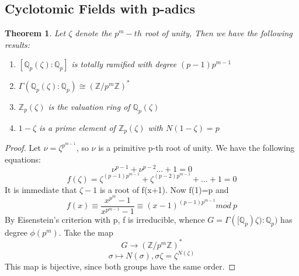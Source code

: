 \documentclass[preprint,12pt,reqno]{elsarticle}
\newtheorem{theorem}{Theorem}
\begin{document}
\subsection{Cyclotomic Fields with p-adics}
\begin{theorem}
    Let $\zeta$ denote the $p^m-th$ root of unity, 
    Then we have the following results:
    \begin{enumerate}
        \item $[\mathbb{Q}_{p}(\zeta):\mathbb{Q}_p]$ is totally ramified with degree $(p-1)p^{m-1}$
        \item $\Gamma(\mathbb{Q}_{p}(\zeta):\mathbb{Q}_p)\cong (\mathbb{Z}/p^{m}\mathbb{Z})^{*}$
        \item $\mathbb{Z}_{p}(\zeta)$ is the valuation ring of $\mathbb{Q}_{p}(\zeta)$
        \item $1-\zeta$ is a prime element of $\mathbb{Z}_{p}(\zeta)$ with $N(1-\zeta)=p$
    \end{enumerate}
\end{theorem}
\begin{proof}
Let $\nu = \zeta^{p^{m-1}}$, so $\nu$ is a primitive p-th root of unity. We have the following equations: 
\begin{equation}
    \nu^{p-1}+\nu^{p-2}...+1=0
\end{equation}
\begin{equation}
   f(\zeta)= \zeta^{(p-1)p^{m-1}}+\zeta^{(p-2)p^{m-1}}+...+1=0
\end{equation}
It is immediate that $\zeta-1$ is a root of f(x+1). Now f(1)=p and \begin{equation}
    f(x)\equiv \frac{x^{p^{m}}-1}{x^{p^{m-1}}-1} \equiv (x-1)^{(p-1)p^{m-1}} mod\:p
\end{equation}
By Eisenstein's criterion with p, f is irreducible, whence $G=\Gamma([\mathbb{Q}_{p})\zeta):\mathbb{Q}_{p})$ has degree $\phi(p^{m})$. Take the map \begin{equation}
    G\longrightarrow (\mathbb{Z}/p^{m}\mathbb{Z})^{*}
\end{equation}
\begin{equation}
    \sigma \longmapsto N(\sigma), \sigma\zeta=\zeta^{N(\zeta)}
\end{equation}
This map is bijective, since both groups have the same order. 
\end{proof}
\end{document}
